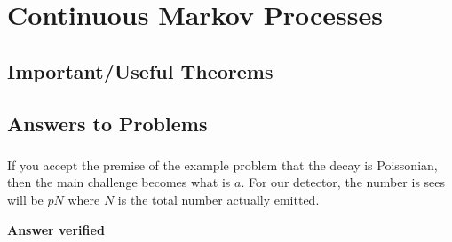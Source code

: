 
\chapter{Continuous Markov Processes}

\section{Important/Useful Theorems}

\subsection{}


\section{Answers to Problems}
\subsection{}
If you accept the premise of the example problem that the decay is Poissonian, then the main challenge becomes what is $a$.  For our detector, the number is sees will be $pN$ where $N$ is the total number actually emitted.  
\begin{equation}

\end{equation}


\textbf{Answer verified}


%
%
%	





